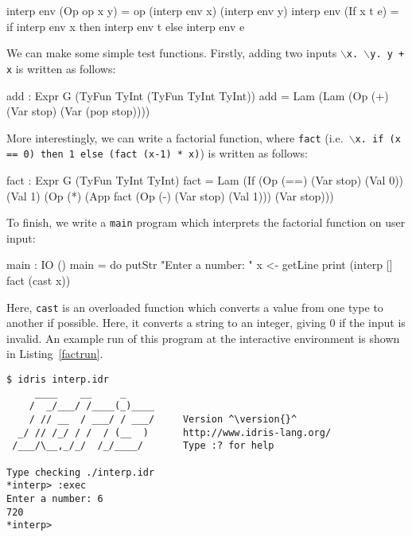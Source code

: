 \begin{code}
interp env (Op op x y) = op (interp env x) (interp env y)
interp env (If x t e)  = if interp env x then interp env t 
                                         else interp env e
\end{code}

\noindent
We can make some simple test functions. Firstly, adding two inputs
\texttt{$\backslash$x. $\backslash$y. y + x} is written as follows:

\begin{code}
add : Expr G (TyFun TyInt (TyFun TyInt TyInt))
add = Lam (Lam (Op (+) (Var stop) (Var (pop stop))))
\end{code}

\noindent
More interestingly, we can write a factorial function, where
\texttt{fact} (i.e.\ \texttt{$\backslash$x. if (x == 0) then 1 else (fact (x-1) * x)}) is written as follows:

\begin{code}
fact : Expr G (TyFun TyInt TyInt)
fact = Lam (If (Op (==) (Var stop) (Val 0))
               (Val 1) (Op (*) (App fact (Op (-) (Var stop) (Val 1))) 
                               (Var stop)))
\end{code}

\noindent
To finish, we write a \texttt{main} program which interprets the factorial function on user input:

\begin{code}
main : IO ()
main = do putStr "Enter a number: "
          x <- getLine
          print (interp [] fact (cast x)) 
\end{code}

\noindent
Here, \texttt{cast} is an overloaded function which converts a value from one type to another if possible.
Here, it converts a string to an integer, giving 0 if the input is invalid.
An example run of this program at the \Idris{} interactive environment is shown in Listing~\ref{factrun}.

\begin{lstlisting}[float=here,caption={Running the well-typed interpreter}, label=factrun, style=stdout]
$ idris interp.idr  
     ____    __     _                                          
    /  _/___/ /____(_)____                                     
    / // __  / ___/ / ___/     Version ^\version{}^
  _/ // /_/ / /  / (__  )      http://www.idris-lang.org/      
 /___/\__,_/_/  /_/____/       Type :? for help                

Type checking ./interp.idr
*interp> :exec 
Enter a number: 6 
720
*interp> 
\end{lstlisting}

